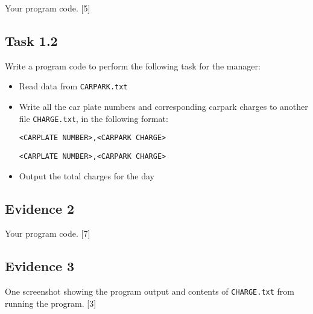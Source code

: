 Your program code.\hfill{} {[}5{]}

\subsection*{Task 1.2 }

Write a program code to perform the following task for the manager:
\begin{itemize}
\item Read data from \texttt{CARPARK.txt }
\item Write all the car plate numbers and corresponding carpark charges
to another file \texttt{CHARGE.txt}, in the following format: 
\noindent \begin{center}
\texttt{<CARPLATE NUMBER>,<CARPARK CHARGE>}
\par\end{center}

\noindent \begin{center}
\texttt{<CARPLATE NUMBER>,<CARPARK CHARGE>}
\par\end{center}
\item Output the total charges for the day
\end{itemize}

\subsection*{Evidence 2 }

Your program code.\hfill{} {[}7{]}

\subsection*{Evidence 3}

One screenshot showing the program output and contents of \texttt{CHARGE.txt}
from running the program.\hfill{} {[}3{]}